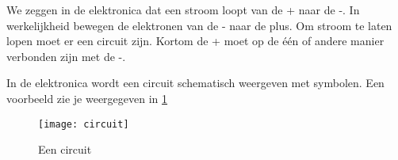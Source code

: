 We zeggen in de elektronica dat een stroom loopt van de + naar de -. In werkelijkheid bewegen de elektronen van de - naar de plus. Om stroom te laten lopen moet er een circuit zijn. Kortom de + moet op de \'e\'en of andere manier verbonden zijn met de -.

In de elektronica wordt een circuit schematisch weergeven met symbolen. Een voorbeeld zie je weergegeven in \ref{symbool:circuit}

\begin{figure}[h]
\texttt{[image: circuit]}
\centering
\caption{Een circuit}
\label{symbool:circuit}
\end{figure}

